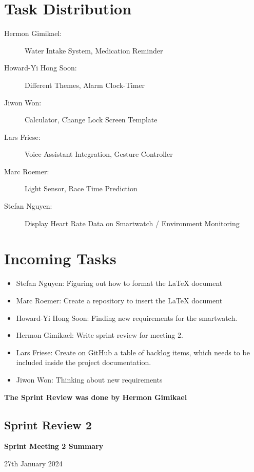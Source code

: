 \documentclass{article}
\begin{document}
\section*{Task Distribution}
\begin{description}
    \item[Hermon Gimikael:] Water Intake System, Medication Reminder 
    \item[Howard-Yi Hong Soon:] Different Themes, Alarm Clock-Timer
    \item[Jiwon Won:] Calculator, Change Lock Screen Template
    \item[Lars Friese:] Voice Assistant Integration, Gesture Controller
    \item[Marc Roemer:] Light Sensor, Race Time Prediction
    \item[Stefan Nguyen:] Display Heart Rate Data on Smartwatch / Environment Monitoring
\end{description}

\section*{Incoming Tasks}
\begin{itemize}
    \item Stefan Nguyen: Figuring out how to format the LaTeX document
    \item Marc Roemer: Create a repository to insert the LaTeX document
    \item Howard-Yi Hong Soon: Finding new requirements for the smartwatch.
    \item Hermon Gimikael: Write sprint review for meeting 2.
    \item Lars Friese: Create on GitHub a table of backlog items, which needs to be included inside the project documentation.
    \item Jiwon Won: Thinking about new requirements
\end{itemize}
\noindent
\textbf{The Sprint Review was done by Hermon Gimikael}
\newpage

\subsection{Sprint Review 2}
\begin{center}
    {\Large \textbf{Sprint Meeting 2 Summary}}
    
    \vspace{0.5cm}
    
    {\large 27th January 2024}
\end{center}
\end{document}
